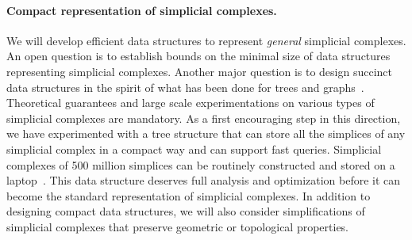 \paragraph{Compact representation of simplicial complexes.}  We will develop efficient data structures to represent {\em general} simplicial complexes. 
An open question is to establish bounds on the minimal size of data structures representing simplicial complexes. Another major question is to design succinct data structures
in the spirit of what has been done for trees and graphs~\cite{Ferragina:2005:SLT:1097112.1097456,Munro:2002:SRB:586840.586885}. 
 Theoretical guarantees and large scale experimentations on various
 types of simplicial complexes are mandatory. As a first encouraging
 step in this direction, we have experimented with a tree structure
 that can store all the simplices of any simplicial complex in a
 compact way and can support fast queries. Simplicial complexes of 500 million simplices can be routinely constructed and stored on a laptop~\cite{bm-dssc-2012}.  This data structure deserves  full analysis and optimization before it can become the standard representation of simplicial complexes. In addition to designing compact data structures, we will also consider simplifications of simplicial complexes that preserve geometric or topological properties.











